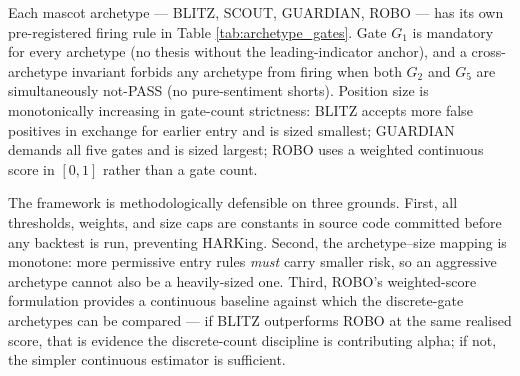 \documentclass[11pt,a4paper]{article}
\begin{document}
Each mascot archetype --- BLITZ, SCOUT, GUARDIAN, ROBO --- has its own pre-registered firing rule in Table \ref{tab:archetype_gates}. Gate $G_1$ is mandatory for every archetype (no thesis without the leading-indicator anchor), and a cross-archetype invariant forbids any archetype from firing when both $G_2$ and $G_5$ are simultaneously not-PASS (no pure-sentiment shorts). Position size is monotonically increasing in gate-count strictness: BLITZ accepts more false positives in exchange for earlier entry and is sized smallest; GUARDIAN demands all five gates and is sized largest; ROBO uses a weighted continuous score in $[0,1]$ rather than a gate count.

\begin{table}[h]
\centering
\small
{}
\caption{Archetype gate-firing rules. Pre-registered in \texttt{signals/gates.py}, constants \texttt{GATE\_REQUIRED\_COUNT}, \texttt{GATE\_MANDATORY}, \texttt{POSITION\_SIZE\_PCT}. ROBO weights: $w_{G_1}=0.35$, $w_{G_2}=0.20$, $w_{G_3}=0.10$, $w_{G_4}=0.15$, $w_{G_5}=0.20$. Cross-archetype invariant: $\neg(G_2 \notin \text{PASS} \wedge G_5 \notin \text{PASS})$.}
\label{tab:archetype_gates}
\end{table}

The framework is methodologically defensible on three grounds. First, all thresholds, weights, and size caps are constants in source code committed before any backtest is run, preventing HARKing. Second, the archetype--size mapping is monotone: more permissive entry rules \emph{must} carry smaller risk, so an aggressive archetype cannot also be a heavily-sized one. Third, ROBO's weighted-score formulation provides a continuous baseline against which the discrete-gate archetypes can be compared --- if BLITZ outperforms ROBO at the same realised score, that is evidence the discrete-count discipline is contributing alpha; if not, the simpler continuous estimator is sufficient.
\end{document}
